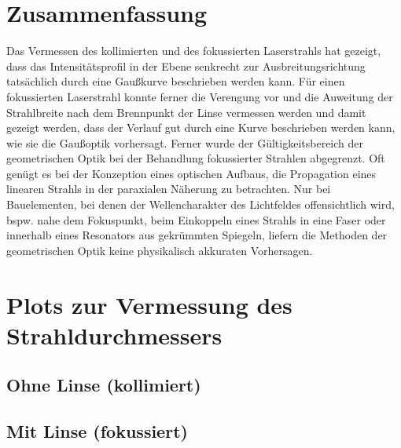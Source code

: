 \documentclass[11pt,a4paper,oneside]{scrartcl}
\begin{document}
\section{Zusammenfassung}
Das Vermessen des kollimierten und des fokussierten Laserstrahls hat gezeigt, dass das Intensitätsprofil in der Ebene senkrecht zur Ausbreitungsrichtung tatsächlich durch eine Gaußkurve beschrieben werden kann. Für einen fokussierten Laserstrahl konnte ferner die Verengung vor und die Auweitung der Strahlbreite nach dem Brennpunkt der Linse vermessen werden und damit gezeigt werden, dass der Verlauf gut durch eine Kurve beschrieben werden kann, wie sie die Gaußoptik vorhersagt. Ferner wurde der Gültigkeitsbereich der geometrischen Optik bei der Behandlung fokussierter Strahlen abgegrenzt. Oft genügt es bei der Konzeption eines optischen Aufbaus, die Propagation eines linearen Strahls in der paraxialen Näherung zu betrachten. Nur bei Bauelementen, bei denen der Wellencharakter des Lichtfeldes offensichtlich wird, bspw. nahe dem Fokuspunkt, beim Einkoppeln eines Strahls in eine Faser oder innerhalb eines Resonators aus gekrümmten Spiegeln, liefern die Methoden der geometrischen Optik keine physikalisch akkuraten Vorhersagen.
\newpage

 

\appendix


\section{Plots zur Vermessung des Strahldurchmessers}
\subsection{Ohne Linse (kollimiert)}
\subsection{Mit Linse (fokussiert)}
\end{document}
